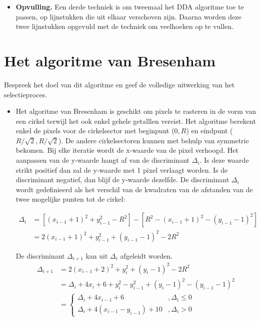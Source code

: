 \documentclass{report}
\begin{document}
\begin{enumerate}
{\begin{itemize}
				\item \textbf{Opvulling.} Een derde techniek is om tweemaal het DDA algoritme toe te passen, op lijnstukken die uit elkaar verschoven zijn. Daarna worden deze twee lijnstukken opgevuld met de techniek om veelhoeken op te vullen.
			\end{itemize}
		}
		
	\end{enumerate}

	\section{Het algoritme van Bresenham}
	\begin{enumerate}
		\vraag
		{
			Bespreek het doel van dit algoritme en geef de volledige uitwerking van het selectieproces. 
	    }
		{
			\begin{itemize}
				\item Het algoritme van Bresenham is geschikt om pixels te rasteren in de vorm van een cirkel terwijl het ook enkel gehele getalllen vereist. Het algoritme berekent enkel de pixels voor de cirkelsector met beginpunt ($0, R$) en eindpunt ($R/\sqrt{2},R/\sqrt{2}$). De andere cirkelsectoren kunnen met behulp van symmetrie bekomen. Bij elke iteratie wordt de x-waarde van de pixel verhoogd. Het aanpassen van de y-waarde hangt af van de discriminant $\Delta_i$. Is deze waarde strikt positief dan zal de y-waarde met 1 pixel verlaagt worden. Is de discriminant negatief, dan blijf de y-waarde dezelfde. De discriminant $\Delta_i$ wordt gedefinieerd als het verschil van de kwadraten van de afstanden van de twee mogelijke punten tot de cirkel:
				
				\begin{equation*}
					\begin{split}
						\Delta_i & = [(x_{i - 1} + 1)^2 + y_{i - 1}^2 - R^2] - [R^2 - (x_{i - 1} + 1)^2 - (y_{i - 1} - 1)^2]  \\
						& = 2(x_{i - 1} + 1)^2 + y_{i - 1}^2 + (y_{i - 1} - 1)^2 - 2R^2
					\end{split}
				\end{equation*}	
				
				De discriminant $\Delta_{i + 1}$ kan uit $\Delta_i$ afgeleidt worden.
				\begin{equation*}
					\begin{split}
						\Delta_{i + 1} & = 2(x_{i - 1} + 2)^2 + y_i^2 + (y_i - 1)^2 - 2R^2 \\
									   & = \Delta_i + 4x_i + 6 + y_i^2 - y_{i - 1}^2 + (y_i - 1)^2 - (y_{i - 1} - 1)^2 \\
									   & = \begin{cases}
											  \Delta_i + 4x_{i - 1} + 6 &, \Delta_i \leq 0 \\
											  \Delta_i + 4(x_{i - 1} - y_{i - 1}) + 10  &, \Delta_i > 0
									 	   \end{cases}
					\end{split}
				\end{equation*}
				

\end{itemize}}
\end{enumerate}
\end{document}
